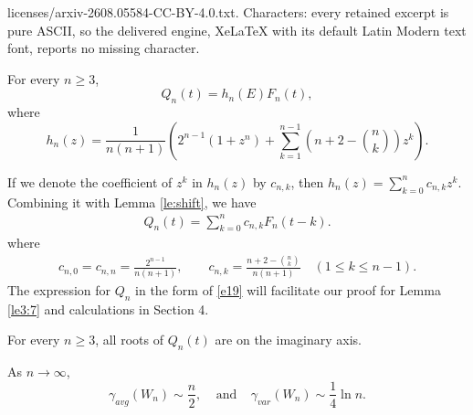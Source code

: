 \documentclass[10pt,a4paper]{amsart}
\begin{document}
licenses/arxiv-2608.05584-CC-BY-4.0.txt. Characters: every retained excerpt is pure ASCII, so the delivered engine, XeLaTeX with its default Latin Modern text font, reports no missing character.
\begin{lemma}\label{le:shift}
For every $n\geq 3$,
\[Q_n(t)=h_n(E)F_n(t),
\]
where
\[
h_n(z)=\frac{1}{n(n+1)}
\left(
2^{n-1}(1+z^n)+\sum_{k=1}^{n-1}\left(n+2-\binom{n}{k}\right)z^k
\right).
\]
\end{lemma}

\begin{remark} If we denote the coefficient of $z^k$ in $h_n(z)$ by $c_{n,k}$, then
\(h_n(z)=\sum_{k=0}^{n} c_{n,k}z^k.\) Combining it with Lemma \ref{le:shift}, we have
\begin{eqnarray}\label{e19}
Q_n(t)=\sum_{k=0}^{n}c_{n,k}F_n(t-k).
\end{eqnarray}
where
\begin{eqnarray}\label{e20}
c_{n,0}=c_{n,n}=\frac{2^{n-1}}{n(n+1)},\qquad
c_{n,k}=\frac{n+2-\binom{n}{k}}{n(n+1)}\quad (1\le k\le n-1).
\end{eqnarray}
The expression for $Q_n$ in the form of \eqref{e19} will facilitate our proof for Lemma \ref{le3:7} and calculations in Section 4.
\end{remark}

\begin{lemma}\label{le3:7}
For every $n\geq 3$, all roots of $Q_{n}(t)$ are on the imaginary axis.
\end{lemma}

\begin{theorem}
\label{thm:average}
As \(n\to\infty\),
\[
\gamma_{avg}(W_n)\sim \frac{n}{2},~~~~~\mbox{and}~~~~~\gamma_{var}(W_n)\sim \frac14\ln n.
\]
\end{theorem}
\end{document}
